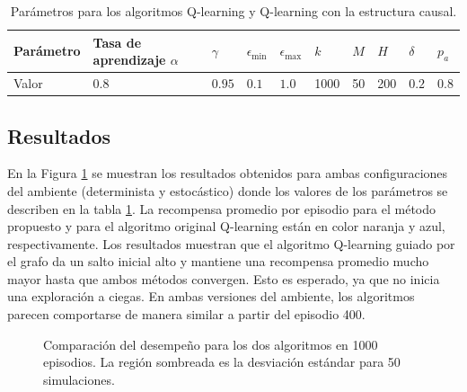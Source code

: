 \begin{table}[!h]
\centering
\caption{Parámetros para los algoritmos Q-learning y Q-learning con la estructura causal.}
\label{tab:tax-params}
\begin{tabular}{@{}llllllllll@{}}
\toprule
Parámetro & Tasa de aprendizaje $\alpha$ & $\gamma$ & $\epsilon_{\min}$ & $\epsilon_{\max}$ & $k$ & 
$M$ & $H$ & $\delta$ & $p_a$ \\ 
\midrule
Valor & $0.8$ & $0.95$ & $0.1$ & $1.0$ & 1000 & 50 & 200 & $0.2$ & $0.8$ \\ \bottomrule
\end{tabular}
\end{table}

\subsection{Resultados}

En la Figura \ref{fig:results-taxi} se muestran los resultados obtenidos
para ambas configuraciones del ambiente (determinista y estocástico) donde
los valores de los parámetros se describen en la tabla \ref{tab:tax-params}.
La recompensa promedio por episodio para el método propuesto y para el algoritmo
original Q-learning están en color naranja y azul, respectivamente. 
Los resultados muestran que el algoritmo Q-learning guiado por el grafo da un salto inicial alto y mantiene una recompensa promedio mucho mayor hasta que ambos métodos convergen. Esto es esperado, ya que
no inicia una exploración a ciegas. En ambas versiones del ambiente, los algoritmos parecen comportarse de manera similar a partir del episodio 400.

\begin{figure}[H]
  \centering
  \hfill
  \caption{Comparación del desempeño para los dos algoritmos en 1000 episodios. La región sombreada es la desviación estándar para 50 simulaciones.}
  \label{fig:results-taxi}
\end{figure}


